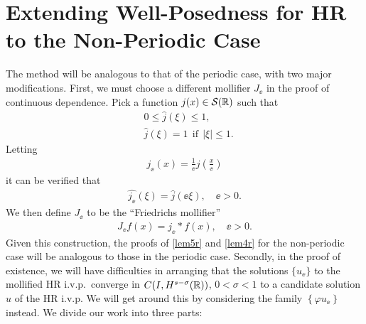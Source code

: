 \section{Extending Well-Posedness for HR to the Non-Periodic Case}
\label{sec:defs}
The method will be analogous to that of the periodic case, with two major
modifications. First, we must choose a different mollifier $J_\ee$ in the
proof of continuous dependence. Pick a
function $j(x) \in \mathcal{S}(\mathbb{R})$ such that
\begin{equation*}
\begin{split}
& 0 \le \widehat{j}(\xi) \le 1,
\\
& \widehat{j}(\xi) = 1 \ \ \text{if} \ \ |\xi| \le 1.
\end{split}
\end{equation*}
Letting
\begin{equation*}
\begin{split}
j_\ee(x) = \frac{1}{\ee} j \left (\frac{x}{\ee} \right )
\end{split}
\end{equation*}
it can be verified that 
\begin{equation*}
\begin{split}
\widehat{j_\ee}(\xi) = \widehat{j }(\ee \xi), \quad \ee > 0.
\end{split}
\end{equation*}
We then define $J_\ee$ to be the ``Friedrichs mollifier''
\begin{equation*}
\begin{split}
J_\ee f(x) = j_\ee * f(x), \quad \ee>0.
\end{split}
\end{equation*}
Given this construction, the proofs of \cref{lem5r} and \cref{lem4r} for the non-periodic case will be
analogous to those in the periodic case.
Secondly, in the proof of existence, we will have difficulties in arranging
that the solutions $\{u_\ee\}$ to the mollified HR i.v.p.\ converge in $C(I,
H^{s- \sigma}(\mathbb{R}))$, $0 < \sigma < 1$ to a candidate solution $u$ of the HR
i.v.p. We will get around this by considering the family $\left\{ \varphi
u_\ee \right\}$ instead.
%
%
%
%
We divide our work into three parts:
